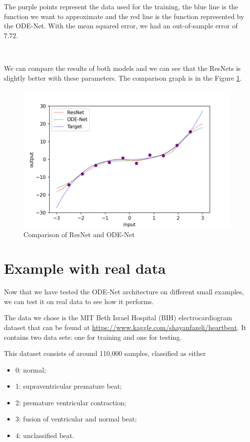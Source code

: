 \documentclass[10pt,a4paper]{article}
\theoremstyle{definition}
\theoremstyle{plain}
\begin{document}
The purple points represent the data used for the training, the blue line is the function we want to approximate and the red line is the function represented by the ODE-Net. With the mean squared error, we had an out-of-sample error of $7.72$.

~

We can compare the results of both models and we can see that the ResNets is slightly better with these parameters. The comparison graph is in the Figure \ref{comparaison}.
\begin{figure}[!h]
\center
\includegraphics[scale=0.75]{comparaison_final.png}
\caption{Comparison of ResNet and ODE-Net}
\label{comparaison}
\end{figure}

\newpage
\section{Example with real data}

Now that we have tested the ODE-Net architecture on different small examples, we can test it on real data to see how it performs. 

The data we chose is the MIT Beth Israel Hospital (BIH) electrocardiogram dataset that can be found at \url{https://www.kaggle.com/shayanfazeli/heartbeat}. It contains two data sets: one for training and one for testing.

This dataset consists of around 110,000 samples, classified as either 
\begin{itemize}
\item 0: normal;
\item 1: supraventricular premature beat;
\item 2: premature ventricular contraction;
\item 3: fusion of ventricular and normal beat;
\item 4: unclassified beat.
\end{itemize}
\end{document}
